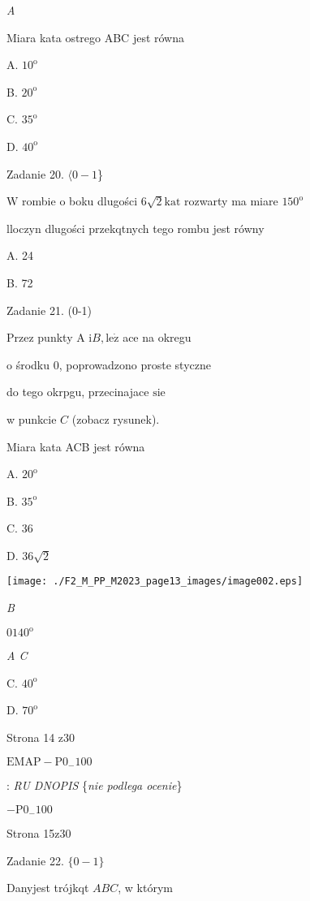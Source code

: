\documentclass[a4paper,12pt]{article}
\begin{document}
{\it A}

Miara kata ostrego ABC jest równa

A. $10^{\mathrm{o}}$

B. $20^{\mathrm{o}}$

C. $35^{\mathrm{o}}$

D. $40^{\mathrm{o}}$

Zadanie 20. $\langle 0-1$\}

$\mathrm{W}$ rombie o boku dlugości $6\sqrt{2} \mathrm{k}\mathrm{a}\mathrm{t}$ rozwarty ma miare $150^{\mathrm{o}}$

lloczyn dlugości przekqtnych tego rombu jest równy

A. 24

B. 72

Zadanie 21. (0-1)

Przez punkty A $\mathrm{i} B, \mathrm{l}\mathrm{e}\dot{\mathrm{z}}$ ace na okregu

o środku 0, poprowadzono proste styczne

do tego okrpgu, przecinajace $\mathrm{s}\mathrm{i}\mathrm{e}$

w punkcie $C$ (zobacz rysunek).

Miara kata ACB jest równa

A. $20^{\mathrm{o}}$

B. $35^{\mathrm{o}}$

C. 36

D. $36\sqrt{2}$
\begin{center}
\texttt{[image: ./F2\_M\_PP\_M2023\_page13\_images/image002.eps]}
\end{center}
{\it B}

$0140^{\mathrm{o}}$

{\it A  C}

C. $40^{\mathrm{o}}$

D. $70^{\mathrm{o}}$

Strona 14 z30

$\mathrm{E}\mathrm{M}\mathrm{A}\mathrm{P}-\mathrm{P}0_{-}100$





: {\it RU DNOPIS} \{{\it nie podlega ocenie}\}

$-\mathrm{P}0_{-}100$

Strona 15z30





Zadanie 22. $\{0-1\}$

Danyjest trójkqt $ABC$, w którym
\end{document}
